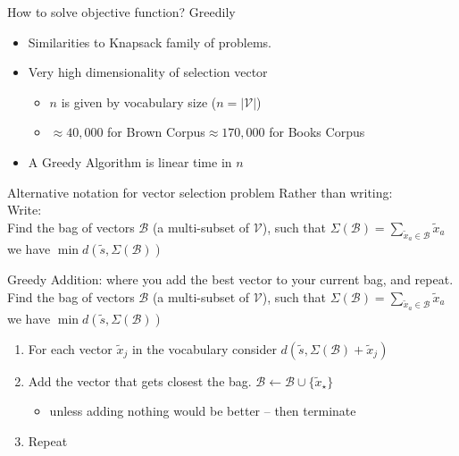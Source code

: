 \documentclass[]{beamer}
\newcommand{\s}{\tilde{s}}
\newcommand{\x}{\tilde{x}}
\newcommand{\V}{\mathcal{V}}
\renewcommand{\B}{\mathcal{B}}
\begin{document}
\begin{frame}{How to solve objective function? Greedily}
	\vectorselectionproblemdefn
		\vfill
	\begin{itemize}
		\item<1-> Similarities to Knapsack family of problems.
		\item<2-> Very high dimensionality of selection vector\begin{itemize}
			\item $n$ is given by vocabulary size ($n=|\V|$)
			\item $\approx40,000$ for Brown Corpus\hfill $\approx170,000$ for Books Corpus\hspace{1em}
			\end{itemize}
		\item<3-> A Greedy Algorithm is linear time in $n$ 
	\end{itemize}
	\vfill
\end{frame}

\newcommand{\vectorselectionproblemdefnalt}{Find the bag of vectors $\B$ (a multi-subset of $\V$), such that $\displaystyle \Sigma(\B)=\sum_{\x_a\in\B}\x_a$ we have  $\min d(\s,\Sigma(\B))$}

\begin{frame}{Alternative notation for vector selection problem}
	Rather than writing:\\
		\vectorselectionproblemdefn
	\vfill
	Write:\\
		\vectorselectionproblemdefnalt
	\vfill
	
\end{frame}


\begin{frame}{Greedy Addition: where you add the best vector to your current bag, and repeat.}
	\vectorselectionproblemdefnalt
	\vfill
	\begin{enumerate}
		\item For each vector $\x_j$ in the vocabulary consider  $d(\s, \Sigma(\B)+\x_j)$
		\item Add the vector that gets closest the bag. $\B\leftarrow\B\cup\{\x_\star\}$
			\begin{itemize}
				\item unless adding nothing would be better -- then terminate
			\end{itemize}
		\item Repeat
	\end{enumerate}
	\vfill
\end{frame}
\end{document}
